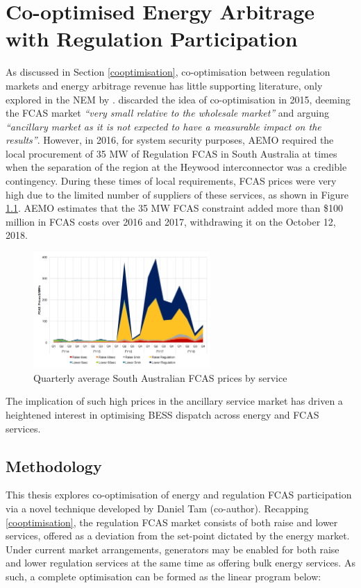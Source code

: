 \chapter{Co-optimised Energy Arbitrage with Regulation Participation}
\label{sec:coop_method}
As discussed in Section \ref{cooptimisation}, co-optimisation between regulation markets and energy arbitrage revenue has little supporting literature, only explored in the NEM by \parencite{Zhai:2018}. \parencite{McConnell} discarded the idea of co-optimisation in 2015, deeming the FCAS market \textit{``very small relative to the wholesale market''} and arguing \textit{``ancillary market as it is not expected to have a measurable impact
on the results''}. However, in 2016, for system security purposes, AEMO required the local procurement of 35 MW of Regulation FCAS in South Australia at times when the separation of the region at the Heywood interconnector was a credible contingency. During these times of local requirements, FCAS prices were very high due to the
limited number of suppliers of these services, as shown in Figure \ref{fig:fcas_prices}. AEMO estimates that the 35 MW FCAS constraint added more than \$100 million in FCAS costs over 2016 and 2017, withdrawing it on the October 12, 2018. 
\begin{figure}[H]
    \centering
    \includegraphics[width=0.6\textwidth]{Pictures/Chapter6/reg_prices.PNG}
    \caption{Quarterly average South Australian FCAS prices by service \parencite{sa_aemo}}
    \label{fig:fcas_prices}
\end{figure}
The implication of such high prices in the ancillary service market has driven a heightened interest in optimising BESS dispatch across energy and FCAS services. \section{ Methodology }
This thesis explores co-optimisation of energy and regulation FCAS participation via a novel technique developed by Daniel Tam (co-author). Recapping \ref{cooptimisation}, the regulation FCAS market consists of both raise and lower services, offered as a deviation from the set-point dictated by the energy market. Under current market arrangements, generators may be enabled for both raise and lower regulation services at the same time as offering bulk energy services. As such, a complete optimisation can be formed as the linear program below:
